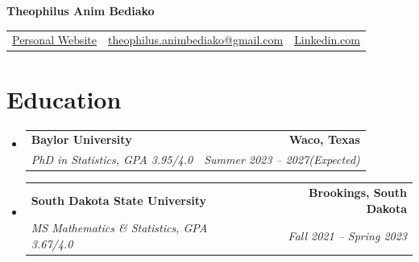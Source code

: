\documentclass[letterpaper,11pt]{article}
\makeatletter
\newcommand{\resumeSubheadingnobullet}[4]{
	\vspace{-1pt}\item[]
	\begin{tabular*}{0.97\textwidth}[t]{l@{\extracolsep{\fill}}r}
		\textbf{#1} & \textbf{#2} \\
		\textit{\small#3} & \textit{\small #4} \\
	\end{tabular*}\vspace{-5pt}
}
\newcommand{\resumeSubHeadingListStart}{\begin{itemize}[leftmargin=0pt]}
\newcommand{\resumeSubHeadingListEnd}{\end{itemize}}
\makeatother
\begin{document}
\begin{center}
	\textbf{\huge Theophilus Anim Bediako}\\
	\begin{tabular}{c c c}
			\faGlobe\enspace\href{https://theoanim.github.io/}{Personal Website}\quad \textbar%
			&\; \faEnvelopeO\enspace \href{mailto:theophilus.animbediako@gmail.com}{theophilus.animbediako@gmail.com} \quad
			&\textbar \quad \faLinkedinSquare\;  \href{https://www.linkedin.com/in/theophilus-anim-bediako-172093206/}{{Linkedin.com}}\\
	\end{tabular}
\end{center}


\section{Education}
\resumeSubHeadingListStart
\resumeSubheadingnobullet
{Baylor University}{Waco, Texas}
{PhD in Statistics, GPA 3.95/4.0}{Summer 2023 -- 2027(Expected)}\vspace{-.1cm}
\resumeSubheadingnobullet
{South Dakota State University}{Brookings, South Dakota}
{MS Mathematics \& Statistics, GPA 3.67/4.0}{Fall 2021 -- Spring 2023}\vspace{-.1cm}
\resumeSubHeadingListEnd

\end{document}
